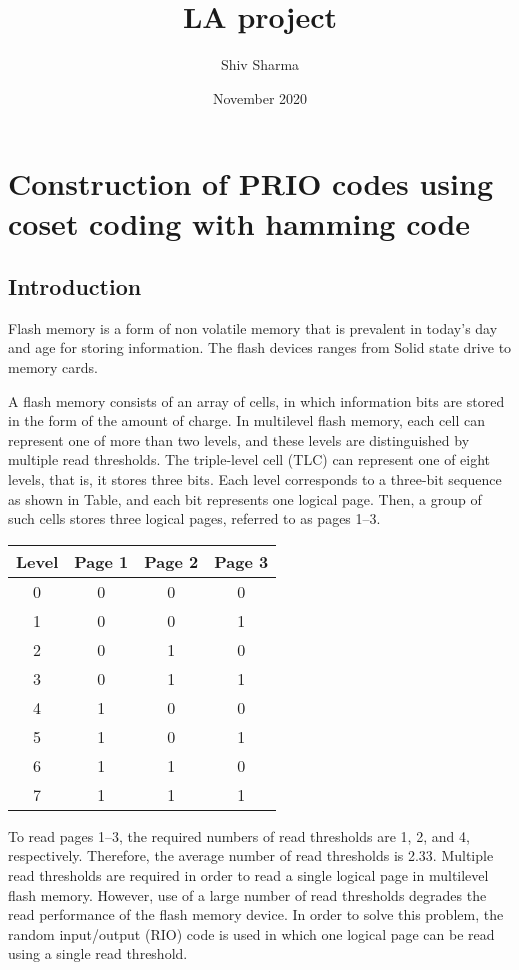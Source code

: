 \documentclass{article}
\title{LA project}
\author{Shiv Sharma }
\date{November 2020}
\begin{document}
\maketitle
\section{Construction of PRIO codes using coset coding with hamming code}
\subsection{Introduction}
Flash memory is  a form of non volatile memory that is  prevalent in today's day and age for storing information. The flash devices ranges from Solid state drive to memory cards.

A flash memory consists of an array of cells, in which information bits are stored in the form of the amount of charge. In multilevel flash memory, each cell can represent one of more than two levels, and these levels are distinguished by multiple read thresholds. The triple-level cell (TLC) can represent one of eight levels, that is, it stores three bits. Each level corresponds to a three-bit sequence as shown in Table, and each bit represents one logical page. Then, a group of such cells stores three logical pages, referred to as pages 1–3. 

\begin{table}[h]
\centering
\begin{tabular}{|c|c|c|c|}
\hline
Level & Page 1 & Page 2 & Page 3 \\ \hline
0     & 0      & 0      & 0      \\ \hline
1     & 0      & 0      & 1      \\ \hline
2     & 0      & 1      & 0      \\ \hline
3     & 0      & 1      & 1      \\ \hline
4     & 1      & 0      & 0      \\ \hline
5     & 1      & 0      & 1      \\ \hline
6     & 1      & 1      & 0      \\ \hline
7     & 1      & 1      & 1      \\ \hline
\end{tabular}
\end{table}

To read pages 1–3, the required numbers of read thresholds are 1, 2, and 4, respectively. Therefore, the average number of read thresholds is 2.33.  Multiple read thresholds are required in order to read a single logical page in multilevel flash memory. However, use of a large number of read thresholds degrades the read performance of the flash memory device. In order to solve this problem, the random input/output (RIO) code is used in which one logical page can be read using a single read threshold. 
\end{document}
